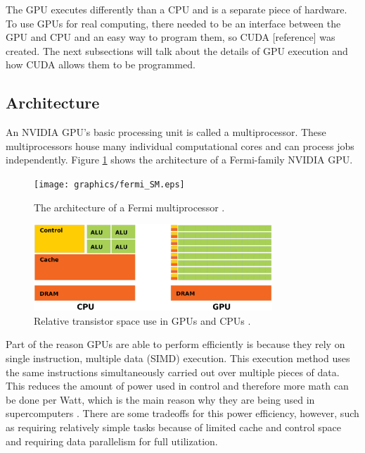 The GPU executes differently than a CPU and is a separate piece of hardware.  To use GPUs for real computing, there needed to be an interface between the GPU and CPU and an easy way to program them, so CUDA [reference] was created.  The next subsections will talk about the details of GPU execution and how CUDA allows them to be programmed. 

\subsection{Architecture}

An NVIDIA GPU's basic processing unit is called a multiprocessor.  These multiprocessors house many individual computational cores and can process jobs independently.  Figure \ref{fermi_SM} shows the architecture of a Fermi-family NVIDIA GPU.  

\begin{figure}[h!] 
  \centering
    \texttt{[image: graphics/fermi\_SM.eps]}
     \caption[The architecture of a Fermi multiprocessor.]{The architecture of a Fermi multiprocessor \cite{cuda}. \label{fermi_SM}}
\end{figure}


\begin{figure}[h!] 
  \centering
    \includegraphics[width=0.8\textwidth]{graphics/CUDA_transistors.eps}
     \caption[Relative transistor space use in GPUs and CPUs.]{Relative transistor space use in GPUs and CPUs \cite{cuda}. \label{cuda_transistors}}
\end{figure}

Part of the reason GPUs are able to perform efficiently is because they rely on single instruction, multiple data (SIMD) execution.  This execution method uses the same instructions simultaneously carried out over multiple pieces of data.  This reduces the amount of power used in control and therefore more math can be done per Watt, which is the main reason why they are being used in supercomputers \cite{exascale}.  There are some tradeoffs for this power efficiency, however, such as requiring relatively simple tasks because of limited cache and control space and requiring data parallelism for full utilization.  

